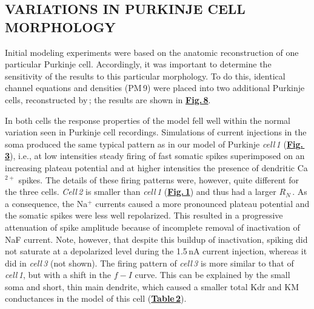 \documentclass[12pt]{article}
\begin{document}
\subsection*{VARIATIONS IN PURKINJE CELL MORPHOLOGY}

Initial modeling experiments were based on the anatomic reconstruction of one particular Purkinje cell. Accordingly, it was important to determine the sensitivity of the results to this particular morphology. To do this, identical channel equations and densities (PM\,9) were placed into two additional Purkinje cells, reconstructed
by\,\cite{Rapp-P:1994qf}; the results are shown in \href{../pub-purkinje-deschutter1-fig-8/../pub-purkinje-deschutter1-fig-8.tex}{\bf Fig.\,8}.

In both cells the response properties of the model fell well within the normal variation seen in Purkinje cell recordings. Simulations of current injections in the soma produced the same typical pattern as in our model of Purkinje {\it cell\,1} (\href{../pub-purkinje-deschutter1-fig-3/pub-purkinje-deschutter1-fig-3.tex}{\bf Fig.\,3}), i.e., at low intensities steady firing of fast somatic spikes superimposed on an increasing plateau potential and at higher intensities the presence of dendritic Ca$^{2+}$ spikes. The details of these firing patterns were, however, quite different for the three cells. {\it Cell\,2} is smaller than {\it cell\,1} (\href{../pub-purkinje-deschutter1-fig-1/pub-purkinje-deschutter1-fig-1.tex}{\bf Fig.\,1}) and thus had a larger $R_N$\,\cite{Rapp-P:1994qf}. As a consequence, the Na$^+$ currents caused a more pronounced plateau potential and the somatic spikes were less well repolarized. This resulted in a progressive attenuation of spike amplitude because of incomplete removal of inactivation of NaF current. Note, however, that despite this buildup of inactivation, spiking did not saturate at a depolarized level during the 1.5\,nA current injection, whereas it did in {\it cell\,3} (not shown). The firing pattern of {\it cell\,3} is more similar to that of {\it cell\,1}, but with a shift in the $f-I$ curve. This can be explained by the small soma and short, thin main dendrite, which caused a smaller total Kdr and KM conductances in the model of this cell (\href{../pub-purkinje-deschutter1-table2/pub-purkinje-deschutter1-table2.tex}{\bf Table\,2}).



\end{document}
